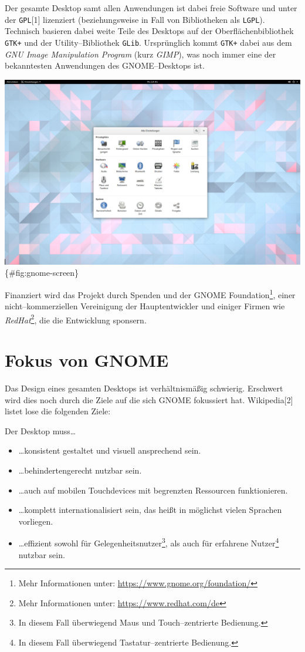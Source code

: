 \documentclass[11pt,ngerman,toc=listof,index=totoc]{scrreprt}
\providecommand{\tightlist}{%
  \setlength{\itemsep}{0pt}\setlength{\parskip}{0pt}}
\begin{document}
Der gesamte Desktop samt allen Anwendungen ist dabei freie Software und
unter der \texttt{GPL}{[}1{]} lizenziert (beziehungsweise in Fall von
Bibliotheken als \texttt{LGPL}). Technisch basieren dabei weite Teile
des Desktops auf der Oberflächenbibliothek \texttt{GTK+} und der
Utility--Bibliothek \texttt{GLib}. Ursprünglich kommt \texttt{GTK+}
dabei aus dem \emph{GNU Image Manipulation Program} (kurz \emph{GIMP}),
was noch immer eine der bekanntesten Anwendungen des GNOME--Desktops
ist.

\includegraphics{docs/pics/gnome-screen.png} \{\#fig:gnome-screen\}

Finanziert wird das Projekt durch Spenden und der GNOME
Foundation\footnote{Mehr Informationen unter:
  \url{https://www.gnome.org/foundation/}}, einer nicht--kommerziellen
Vereinigung der Hauptentwickler und einiger Firmen wie
\emph{RedHat}\footnote{Mehr Informationen unter:
  \url{https://www.redhat.com/de}}, die die Entwicklung sponsern.

\section{Fokus von GNOME}\label{fokus-von-gnome}

Das Design eines gesamten Desktops ist verhältnismäßig schwierig.
Erschwert wird dies noch durch die Ziele auf die sich GNOME fokussiert
hat. Wikipedia{[}2{]} listet lose die folgenden Ziele:

Der Desktop muss\ldots{}

\begin{itemize}
\tightlist
\item
  \ldots{}konsistent gestaltet und visuell ansprechend sein.
\item
  \ldots{}behindertengerecht nutzbar sein.
\item
  \ldots{}auch auf mobilen Touchdevices mit begrenzten Ressourcen
  funktionieren.
\item
  \ldots{}komplett internationalisiert sein, das heißt in möglichst
  vielen Sprachen vorliegen.
\item
  \ldots{}effizient sowohl für Gelegenheitsnutzer\footnote{In diesem
    Fall überwiegend Maus und Touch--zentrierte Bedienung.}, als auch
  für erfahrene Nutzer\footnote{In diesem Fall überwiegend
    Tastatur--zentrierte Bedienung.} nutzbar sein.
\end{itemize}
\end{document}
